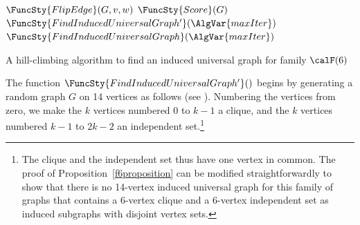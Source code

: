 \begin{algorithm}[h!]
\DontPrintSemicolon
\nl $\FuncSty{FlipEdge}(G, v, w)$  \;
\nl {}
\medskip
\nl $\FuncSty{Score}(G)$  \;
\nl {}
\medskip
    \nl $\FuncSty{FindInducedUniversalGraph'}(\AlgVar{maxIter})$  \;
\nl {}
\medskip
    \nl $\FuncSty{FindInducedUniversalGraph}(\AlgVar{maxIter})$  \;
\nl {}
\caption{A hill-climbing algorithm to find an induced universal graph for family $\calF(6)$}
\label{alg:heuristic}
\end{algorithm}

The function $\FuncSty{FindInducedUniversalGraph'}()$
begins by generating a random graph $G$ on 14 vertices as follows
(see ).
Numbering the vertices from zero, we make the
$k$ vertices numbered $0$ to $k-1$ a clique, and the $k$ vertices numbered $k-1$ to $2k-2$ an
independent set.\footnote{The
clique and the independent set thus have one vertex
in common.  The proof of Proposition~\ref{f6proposition} can be modified straightforwardly
to show that there is no 14-vertex induced universal graph for this family of graphs
that contains a 6-vertex clique and a 6-vertex independent set as
induced subgraphs with disjoint vertex sets.}

